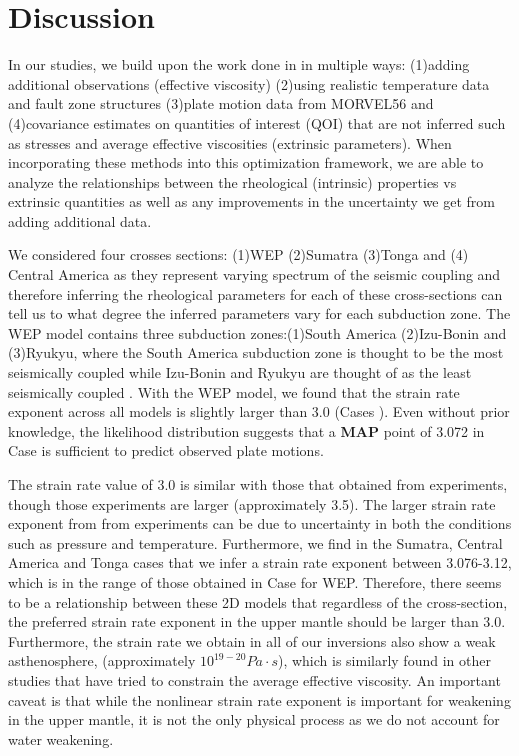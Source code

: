 \documentclass[12pt]{article}
\begin{document}
\section{Discussion}
In our studies, we build upon the work done in \citep{ratnaswamy2015adjoint} in multiple ways: (1)adding additional observations (effective viscosity) (2)using realistic temperature data and fault zone structures (3)plate motion data from MORVEL56 and (4)covariance estimates on quantities of interest (QOI) that are not inferred such as stresses and average effective viscosities (extrinsic parameters). When incorporating these methods into this optimization framework, we are able to analyze the relationships between the rheological (intrinsic) properties vs extrinsic quantities as well as any improvements in the uncertainty we get from adding additional data.

 We considered four crosses sections: (1)WEP (2)Sumatra (3)Tonga and (4) Central America as they represent varying spectrum of the seismic coupling and therefore inferring the rheological parameters for each of these cross-sections can tell us to what degree the inferred parameters vary for each subduction zone. The WEP model contains three subduction zones:(1)South America (2)Izu-Bonin and (3)Ryukyu, where the South America subduction zone is thought to be the most seismically coupled while Izu-Bonin and Ryukyu are thought of as the least seismically coupled \citep{scholz2012seismic}. With the WEP model, we found that the strain rate exponent across all models is slightly larger than 3.0 (Cases ). Even without prior knowledge, the likelihood distribution suggests that a \textbf{MAP} point of 3.072 in Case is sufficient to predict observed plate motions. 
  
  The strain rate value of 3.0 is similar with those that obtained from experiments, though those experiments are larger (approximately 3.5). The larger strain rate exponent from from experiments can be due to uncertainty in both the conditions such as pressure and temperature. Furthermore, we find in the Sumatra, Central America and Tonga cases that we infer a strain rate exponent between 3.076-3.12, which is in the range of those obtained in Case for WEP. Therefore, there seems to be a relationship between these 2D models that regardless of the cross-section, the preferred strain rate exponent in the upper mantle should be larger than 3.0. Furthermore, the strain rate we obtain in all of our inversions also show a weak asthenosphere, (approximately $10^{19-20}Pa\cdot s$), which is similarly found in other studies that have tried to constrain the average effective viscosity. An important caveat is that while the nonlinear strain rate exponent is important for weakening in the upper mantle, it is not the only physical process as we do not account for water weakening.
  
\end{document}
